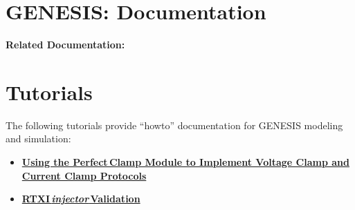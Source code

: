 \documentclass[12pt]{article}
\begin{document}
\section*{GENESIS: Documentation}

{\bf Related Documentation:}

\section*{Tutorials}

The following tutorials provide ``howto'' documentation for GENESIS modeling and simulation:
\begin{itemize}
   \item[]\href{../pclamp/pclamp.tex}{\bf Using the Perfect\,Clamp Module to Implement Voltage Clamp and Current Clamp Protocols}
   \item[]\href{../rtxi-injector-validation/rtxi-injector-validation.tex}{\bf RTXI\,{\it injector}\,Validation}
\end{itemize}
\end{document}
